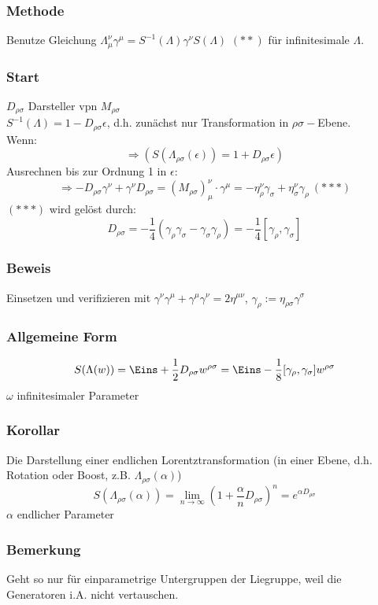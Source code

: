 \documentclass[twoside,a4paper]{scrartcl}
\renewcommand{\1}{\mathds{1}}
\newcommand{\Ra}{\Rightarrow}
\newcommand{\ra}{\rightarrow}
\renewcommand{\L}{\Lambda}
\begin{document}
\subsubsection*{Methode}
Benutze Gleichung $\L^\nu_\mu \gamma^\mu=S^{-1}(\L)\gamma^\nu S(\L)$ $(**)$ für infinitesimale $\L$.

\subsubsection*{Start}
$D_{\rho\sigma}$ Darsteller vpn $M_{\rho\sigma}$\\
$S^{-1}(\L)=1-D_{\rho\sigma}\epsilon$, d.h. zunächst nur Transformation in $\rho\sigma-$Ebene.\\
Wenn:
$$\Ra (S(\L_{\rho\sigma}(\epsilon))=1+D_{\rho\sigma}\epsilon)$$
Ausrechnen bis zur Ordnung 1 in $\epsilon$:
$$\Ra -D_{\rho\sigma}\gamma^\nu+\gamma^\nu D_{\rho\sigma}=(M_{\rho\sigma})^\nu_\mu \cdot \gamma^\mu=-\eta_\rho^\nu\gamma_\sigma+\eta^\nu_\sigma \gamma_\rho \ (***)$$
$(***)$ wird gelöst durch:
$$D_{\rho\sigma}=-\frac{1}{4}(\gamma_\rho\gamma_\sigma-\gamma_\sigma\gamma_\rho)=-\frac{1}{4}[\gamma_\rho,\gamma_\sigma]$$

\subsubsection*{Beweis}
Einsetzen und verifizieren mit $\gamma^\nu\gamma^\mu+\gamma^\mu\gamma^\nu=2\eta^{\mu\nu}$, $\gamma_\rho:=\eta_{\rho\sigma}\gamma^\sigma$

\subsubsection*{Allgemeine Form}
$$S(\L(w))=\Eins+\frac{1}{2}D_{\rho\sigma}w^{\rho\sigma}=\Eins-\frac{1}{8}[\gamma_\rho,\gamma_\sigma]w^{\rho\sigma}$$
$\omega$ infinitesimaler Parameter
\subsubsection*{Korollar}
Die Darstellung einer endlichen Lorentztransformation (in einer Ebene, d.h. Rotation oder Boost, z.B. $\L_{\rho\sigma}(\alpha)$)
$$S(\L_{\rho\sigma}(\alpha))=\lim_{n\ra \infty} (1+\frac{\alpha}{n} D_{\rho\sigma})^n=e^{\alpha D_{\rho\sigma}}$$
$\alpha$ endlicher Parameter
\subsubsection*{Bemerkung}
Geht so nur für einparametrige Untergruppen der Liegruppe, weil die Generatoren i.A. nicht vertauschen.
\end{document}
